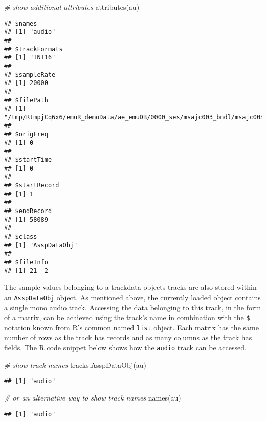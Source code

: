 \documentclass[
]{book}
\newenvironment{Shaded}{\begin{snugshade}}{\end{snugshade}}
\newcommand{\CommentTok}[1]{\textcolor[rgb]{0.56,0.35,0.01}{\textit{#1}}}
\newcommand{\FunctionTok}[1]{\textcolor[rgb]{0.00,0.00,0.00}{#1}}
\newcommand{\NormalTok}[1]{#1}
\newcommand{\SpecialCharTok}[1]{\textcolor[rgb]{0.00,0.00,0.00}{#1}}
\begin{document}
\begin{Shaded}
\begin{Highlighting}[]
\CommentTok{\# show additional attributes}
\FunctionTok{attributes}\NormalTok{(au)}
\end{Highlighting}
\end{Shaded}

\begin{verbatim}
## $names
## [1] "audio"
## 
## $trackFormats
## [1] "INT16"
## 
## $sampleRate
## [1] 20000
## 
## $filePath
## [1] "/tmp/RtmpjCq6x6/emuR_demoData/ae_emuDB/0000_ses/msajc003_bndl/msajc003.wav"
## 
## $origFreq
## [1] 0
## 
## $startTime
## [1] 0
## 
## $startRecord
## [1] 1
## 
## $endRecord
## [1] 58089
## 
## $class
## [1] "AsspDataObj"
## 
## $fileInfo
## [1] 21  2
\end{verbatim}

The sample values belonging to a trackdata objects tracks are also stored within an \texttt{AsspDataObj} object. As mentioned above, the currently loaded object contains a single mono audio track. Accessing the data belonging to this track, in the form of a matrix, can be achieved using the track's name in combination with the \texttt{\$} notation known from R's common named \texttt{list} object. Each matrix has the same number of rows as the track has records and as many columns as the track has fields. The R code snippet below shows how the \texttt{audio} track can be accessed.

\begin{Shaded}
\begin{Highlighting}[]
\CommentTok{\# show track names}
\FunctionTok{tracks.AsspDataObj}\NormalTok{(au)}
\end{Highlighting}
\end{Shaded}

\begin{verbatim}
## [1] "audio"
\end{verbatim}

\begin{Shaded}
\begin{Highlighting}[]
\CommentTok{\# or an alternative way to show track names}
\FunctionTok{names}\NormalTok{(au)}
\end{Highlighting}
\end{Shaded}

\begin{verbatim}
## [1] "audio"
\end{verbatim}

\begin{Shaded}
\end{Shaded}
\end{document}

